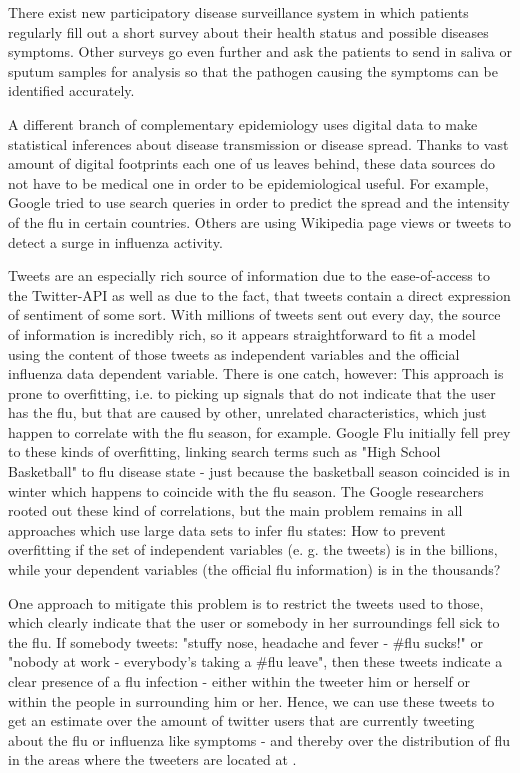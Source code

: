 \documentclass[11pt, a4paper]{article}\usepackage[]{graphicx}\usepackage[]{color}
\begin{document}
There exist new participatory disease surveillance system in which patients regularly fill out a short survey about their health status and possible diseases symptoms. Other surveys go even further and ask the patients to send in saliva or sputum samples for analysis so that the pathogen causing the symptoms can be identified accurately.\newline

A different branch of complementary epidemiology uses digital data to make statistical inferences about disease transmission or disease spread. Thanks to vast amount of digital footprints each one of us leaves behind, these data sources do not have to be medical one in order to be epidemiological useful. For example, Google tried to use search queries in order to predict the spread and the intensity of the flu in certain countries. Others are using Wikipedia page views or tweets to detect a surge in influenza activity.\newline

Tweets are an especially rich source of information due to the ease-of-access to the Twitter-API as well as due to the fact, that tweets contain a direct expression of sentiment of some sort. With millions of tweets  sent out every day, the source of information is incredibly rich, so it appears straightforward to fit a model using the content of those tweets as independent variables and the official influenza data dependent variable. There is one catch, however: This approach is prone to overfitting, i.e. to picking up signals that do not indicate that the user has the flu, but that are caused by other, unrelated characteristics, which just happen to correlate with the flu season, for example. Google Flu initially fell prey to these kinds of overfitting, linking search terms such as "High School Basketball" to flu disease state - just because the basketball season coincided is in winter which happens to coincide with the flu season. The Google researchers rooted out these kind of correlations, but the main problem remains in all approaches which use large data sets to infer flu states: How to prevent overfitting if the set of independent variables (e. g. the tweets) is in the billions, while your dependent variables (the official flu information) is in the thousands?\newline

One approach to mitigate this problem is to restrict the tweets used to those, which clearly indicate that the user or somebody in her surroundings fell sick to the flu. If somebody tweets: "stuffy nose, headache and fever - \#flu sucks!" or "nobody at work - everybody's taking a \#flu leave", then these tweets indicate a clear presence of a flu infection - either within the tweeter him or herself or within the people in surrounding him or her. Hence, we can use these tweets to get an estimate over the amount of twitter users that are currently tweeting about the flu or influenza like symptoms - and thereby over the distribution of flu in the areas where the tweeters are located at .\newline
\end{document}
